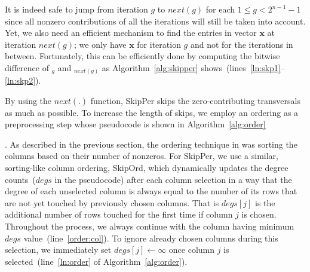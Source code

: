 \documentclass{elektr}
\newcommand{\Ab}{\mathbf{A}}
\newcommand{\xb}{\mathbf{x}}
\begin{document}
{{\begin{minipage}[t]{0.4\textwidth}
\begin{algorithm}[H]
\begin{algorithmic}[1]
		\EndIf
	\EndFor
\EndFor

 \label{order:col}
\label{ln:order}
 \label{order:row}

		 \label{order:row2}

	\EndIf
\EndFor
\EndIf
\EndFor
\EndFor
\State{$\Ab' \leftarrow \Ab[rowPerm, colPerm]$}
\end{algorithmic}
\end{algorithm}
\end{minipage}

It is indeed safe to jump from iteration $g$ to $next(g)$ for each $1 \leq g < 2^{n-1} - 1$ since all nonzero contributions of all the iterations will still be taken into account. Yet, we also need an efficient mechanism to find the entries in vector $\xb$ at iteration $next(g)$; we only have $\xb$ for iteration $g$ and not for the iterations in between. Fortunately, this can be efficiently done by computing the bitwise difference of {}$_{g}$ and {}$_{next(g)}$ as Algorithm~\ref{alg:skipper} shows~(lines~\ref{ln:skp1}--\ref{ln:skp2}). 


By using the $next(.)$ function, {\sc SkipPer} skips the zero-contributing transversals as much as possible. To increase the length of skips, we employ an ordering as a preprocessing step whose pseudocode is shown in Algorithm~\ref{alg:order}}. As described in the previous section, the ordering technique in {} was sorting the columns based on
their number of nonzeros. 
For {\sc SkipPer}, we use a similar, sorting-like column ordering,  {\sc SkipOrd}, which dynamically updates the degree counts~($degs$ in the pseudocode) after each column selection in a way that the degree of each 
unselected column is always equal to the number of its rows that are not yet touched by previously chosen columns. That is $degs[j]$ is the additional number of rows touched for the first time if column $j$ is chosen. Throughout the process, we always continue with the column having minimum $degs$ value~(line~\ref{order:col}).  To ignore already chosen columns during this selection, we immediately set $degs[j] \leftarrow \infty$ once column $j$ is selected~(line~\ref{ln:order} of Algorithm~\ref{alg:order}). 

}
\end{document}
